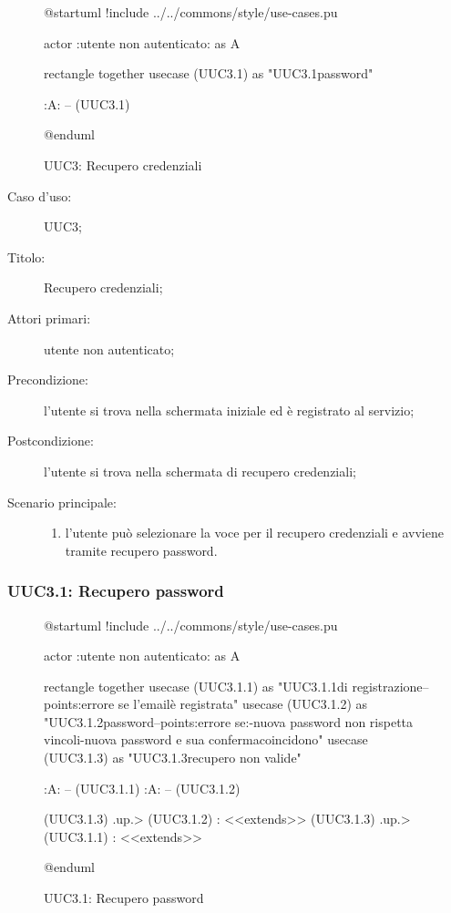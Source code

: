 \documentclass[../../../analisi-dei-requisiti.tex]{subfiles}
\begin{document}
\begin{figure}[H]
  \centering
  \begin{plantuml}
  @startuml
  !include ../../commons/style/use-cases.pu

  actor :utente non autenticato: as A

  rectangle {
    together {
      usecase (UUC3.1) as "UUC3.1\nRecupero password"
    }
  }

  :A: -- (UUC3.1)

  @enduml
  \end{plantuml}
  \caption{UUC3: Recupero credenziali}%
  \label{fig:uuc3}
\end{figure}

\begin{description}
  \item[Caso d’uso:] UUC3;
  \item[Titolo:] Recupero credenziali;
  \item[Attori primari:] utente non autenticato;
  \item[Precondizione:] l'utente si trova nella schermata iniziale ed è registrato al servizio;
  \item[Postcondizione:] l'utente si trova nella schermata di recupero credenziali;
  \item[Scenario principale:]
        \begin{enumerate}
          \item l'utente può selezionare la voce per il recupero credenziali e avviene tramite recupero password.
        \end{enumerate}
\end{description}

\subsubsection{UUC3.1: Recupero password}%
\label{subs:UUC3.1}

\begin{figure}[H]
  \centering
  \begin{plantuml}
  @startuml
  !include ../../commons/style/use-cases.pu

  actor :utente non autenticato: as A

  rectangle {
    together {
      usecase (UUC3.1.1) as "UUC3.1.1\nInserimento\nemail di registrazione\n--\nExtension points:\nVisualizzazione errore se l'email\nnon è registrata"
      usecase (UUC3.1.2) as "UUC3.1.2\nReimpostazione password\n--\nExtension points:\nVisualizzazione errore se:\n-nuova password non rispetta vincoli\n-nuova password e sua conferma\nnon coincidono"
      usecase (UUC3.1.3) as "UUC3.1.3\nInformazioni recupero non valide"
    }
  }

  :A: -- (UUC3.1.1)
  :A: -- (UUC3.1.2)

  (UUC3.1.3) .up.> (UUC3.1.2) : <<extends>>
  (UUC3.1.3) .up.> (UUC3.1.1) : <<extends>>

  @enduml
  \end{plantuml}
  \caption{UUC3.1: Recupero password}%
  \label{fig:uuc3_1}
\end{figure}
\end{document}
